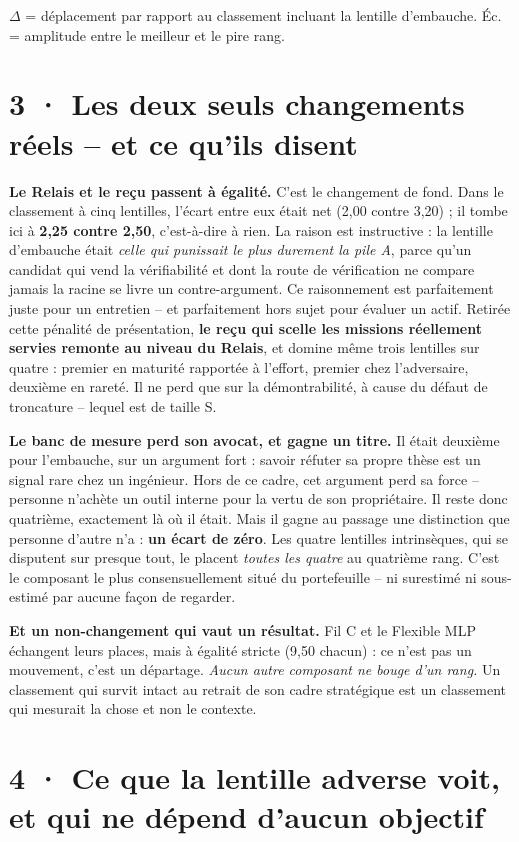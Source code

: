\documentclass[10pt]{article}
\newcommand{\sz}[1]{{\small\color{grey}\textsf{#1}}}
\begin{document}
\sz{$\Delta$ = déplacement par rapport au classement incluant la lentille d'embauche. Éc. = amplitude
entre le meilleur et le pire rang.}

\section{3 · Les deux seuls changements réels -- et ce qu'ils disent}

\textbf{Le Relais et le reçu passent à égalité.} C'est le changement de fond. Dans le classement à cinq
lentilles, l'écart entre eux était net (2,00 contre 3,20) ; il tombe ici à \textbf{2,25 contre 2,50},
c'est-à-dire à rien. La raison est instructive : la lentille d'embauche était \emph{celle qui punissait
le plus durement la pile A}, parce qu'un candidat qui vend la vérifiabilité et dont la route de
vérification ne compare jamais la racine se livre un contre-argument. Ce raisonnement est parfaitement
juste pour un entretien -- et parfaitement hors sujet pour évaluer un actif. Retirée cette pénalité de
présentation, \textbf{le reçu qui scelle les missions réellement servies remonte au niveau du Relais}, et
domine même trois lentilles sur quatre : premier en maturité rapportée à l'effort, premier chez
l'adversaire, deuxième en rareté. Il ne perd que sur la démontrabilité, à cause du défaut de troncature
-- lequel est de taille S.

\textbf{Le banc de mesure perd son avocat, et gagne un titre.} Il était deuxième pour l'embauche, sur un
argument fort : savoir réfuter sa propre thèse est un signal rare chez un ingénieur. Hors de ce cadre,
cet argument perd sa force -- personne n'achète un outil interne pour la vertu de son propriétaire. Il
reste donc quatrième, exactement là où il était. Mais il gagne au passage une distinction que personne
d'autre n'a : \textbf{un écart de zéro}. Les quatre lentilles intrinsèques, qui se disputent sur presque
tout, le placent \emph{toutes les quatre} au quatrième rang. C'est le composant le plus consensuellement
situé du portefeuille -- ni surestimé ni sous-estimé par aucune façon de regarder.

\textbf{Et un non-changement qui vaut un résultat.} Fil C et le Flexible MLP échangent leurs places, mais
à égalité stricte (9,50 chacun) : ce n'est pas un mouvement, c'est un départage. \emph{Aucun autre
composant ne bouge d'un rang.} Un classement qui survit intact au retrait de son cadre stratégique est un
classement qui mesurait la chose et non le contexte.

\section{4 · Ce que la lentille adverse voit, et qui ne dépend d'aucun objectif}
\end{document}
